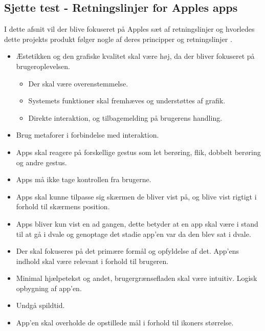 \subsection{Sjette test - Retningslinjer for Apples apps}
I dette afsnit vil der blive fokuseret på Apples sæt af retningslinjer og hvorledes dette projekts produkt følger nogle af deres principper og retningslinjer \citep{AppleRetning}. 

\begin{itemize}
\item Æstetikken og den grafiske kvalitet skal være høj, da der bliver fokuseret på brugeroplevelsen.
\begin{itemize}
	\item Der skal være overenstemmelse.
	\item Systemets funktioner skal fremhæves og understøttes af grafik.
	\item Direkte interaktion, og tilbagemelding på brugerens handling.
\end{itemize}

\item Brug metaforer i forbindelse med interaktion.
	
\item Apps skal reagere på forskellige gestus som let berøring, flik, dobbelt berøring og andre gestus.

\item Apps må ikke tage kontrollen fra brugerne.

\item Apps skal kunne tilpasse sig skærmen de bliver vist på, og blive vist rigtigt i forhold til skærmens position.

\item Apps bliver kun vist en ad gangen, dette betyder at en app skal være i stand til at gå i dvale og genoptage det stadie app'en var da den blev sat i dvale.

\item Der skal fokuseres på det primære formål og opfyldelse af det. App'ens indhold skal være relevant i forhold til brugeren.

\item Minimal hjælpetekst og andet, brugergrænsefladen skal være intuitiv. Logisk opbygning af app'en.

\item Undgå spildtid.

\item App'en skal overholde de opstillede mål i forhold til ikoners størrelse. 
\end{itemize}

